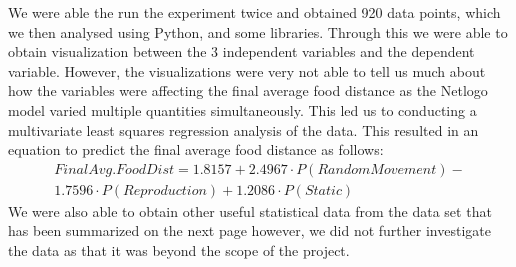 \documentclass[a4paper, 12pt]{article}
\begin{document}
We were able the run the experiment twice and obtained 920 data points, which we then analysed using Python, and some libraries. Through this we were able to obtain visualization between the 3 independent variables and the dependent variable. However, the visualizations were very not able to tell us much about how the variables were affecting the final average food distance as the Netlogo model varied multiple quantities simultaneously. This led us to conducting a multivariate least squares regression analysis of the data. This resulted in an equation to predict the final average food distance as follows:
\begin{multline*}
        Final Avg. Food Dist = 1.8157 + 2.4967\cdot P(Random Movement) -\\ 1.7596\cdot P(Reproduction) + 1.2086\cdot P(Static)
\end{multline*}
We were also able to obtain other useful statistical data from the data set that has been summarized on the next page however, we did not further investigate the data as that it was beyond the scope of the project. 
\end{document}
